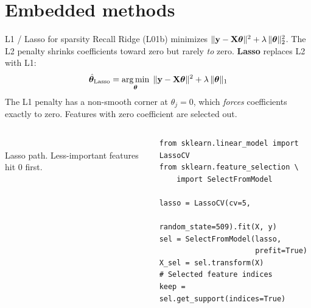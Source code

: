 \documentclass[aspectratio=169]{beamer}
\begin{document}
\section{Embedded methods}

\begin{frame}[fragile]{L1 / Lasso for sparsity}
  Recall Ridge (L01b) minimizes $\|\mathbf{y} - \mathbf{X}\bm{\theta}\|^2 + \lambda\,\|\bm{\theta}\|_2^2$. The L2 penalty shrinks coefficients toward zero but rarely \emph{to} zero.
  \vfill
  \textbf{Lasso} replaces L2 with L1:
  \[
    \hat{\bm{\theta}}_{\text{Lasso}} = \mathop{\mathrm{arg\,min}}_{\bm{\theta}}\; \| \mathbf{y} - \mathbf{X}\bm{\theta} \|^2 + \lambda \, \| \bm{\theta} \|_1
  \]
  The L1 penalty has a non-smooth corner at $\theta_j = 0$, which \emph{forces} coefficients exactly to zero. Features with zero coefficient are selected out.
  \vfill
  \begin{columns}[T]
    \begin{center}
      \\
      \scriptsize Lasso path. Less-important features hit 0 first.
    \end{center}
{\lstset{basicstyle=\ttfamily\scriptsize}
\begin{lstlisting}
from sklearn.linear_model import LassoCV
from sklearn.feature_selection \
    import SelectFromModel

lasso = LassoCV(cv=5,
                random_state=509).fit(X, y)
sel = SelectFromModel(lasso,
                      prefit=True)
X_sel = sel.transform(X)
# Selected feature indices
keep = sel.get_support(indices=True)
\end{lstlisting}}
  \end{columns}
\end{frame}
\end{document}
